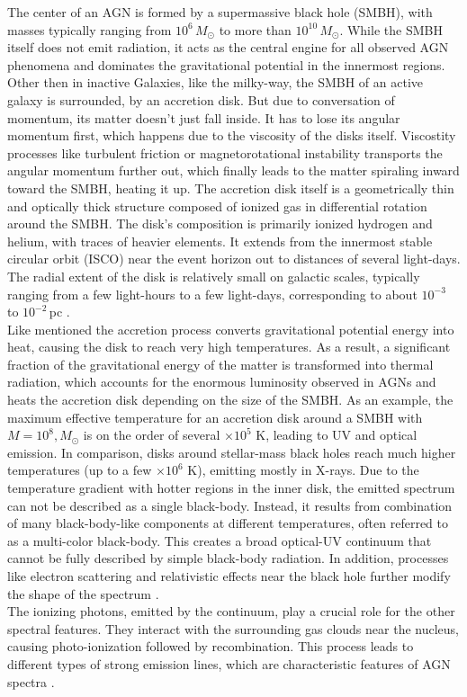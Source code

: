 The center of an AGN is formed by a supermassive black hole (SMBH), with masses typically ranging from $10^6\,M_\odot$ to more than $10^{10}\,M_\odot$. While the SMBH itself does not emit radiation, it  acts as the central engine for all observed AGN phenomena and dominates the gravitational potential in the innermost regions. Other then in inactive Galaxies, like the milky-way, the SMBH of an active galaxy is surrounded, by an accretion disk. But due to conversation of momentum, its matter doesn't just fall inside. It has to lose its angular momentum first, which happens due to the viscosity of the disks itself. Viscostity processes like turbulent friction or magnetorotational instability transports the angular momentum further out, which finally leads to the matter spiraling inward toward the SMBH, heating it up. The accretion disk itself is a geometrically thin and optically thick structure composed of ionized gas in differential rotation around the SMBH. The disk's composition is primarily ionized hydrogen and helium, with traces of heavier elements. It extends from the innermost stable circular orbit (ISCO) near the event horizon out to distances of several light-days. The radial extent of the disk is relatively small on galactic scales, typically ranging from a few light-hours to a few light-days, corresponding to about $10^{-3}$ to $10^{-2}$\,pc \parencite{netzer2013agn,hickox2018obscured, shakura1973black}.  \\
Like mentioned the accretion process converts gravitational potential energy into heat, causing the disk to reach very high temperatures. As a result, a significant fraction of the gravitational energy of the matter is transformed into thermal radiation, which accounts for the enormous luminosity observed in AGNs and heats the accretion disk depending on the size of the SMBH. As an example, the maximum effective temperature for an accretion disk around a SMBH with $M = 10^8,M_\odot$ is on the order of several $\times 10^5$ K, leading to UV and optical emission. In comparison, disks around stellar-mass black holes reach much higher temperatures (up to a few $\times 10^6$ K), emitting mostly in X-rays. Due to the temperature gradient with hotter regions in the inner disk, the emitted spectrum can not be described as a single black-body. Instead, it results from combination of many black-body-like components at different temperatures, often referred to as a multi-color black-body. This creates a broad optical-UV continuum that cannot be fully described by simple black-body radiation. In addition, processes like electron scattering and relativistic effects near the black hole further modify the shape of the spectrum \parencite{osterbrock1989agn}.\\
The ionizing photons, emitted by the continuum, play a crucial role for the other spectral features. They interact with the surrounding gas clouds near the nucleus, causing photo-ionization followed by recombination. This process leads to different types of strong emission lines, which are characteristic features of AGN spectra \parencite{netzer2013agn, osterbrock1989agn}.


